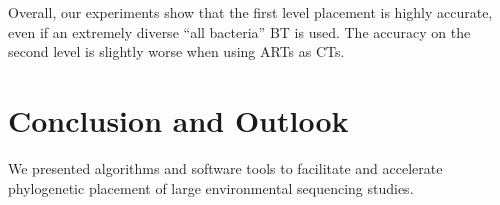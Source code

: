 
Overall, our experiments show that the first level placement is highly accurate,
even if an extremely diverse ``all bacteria'' \acl{BT} is used.
The accuracy on the second level is slightly worse when using \acp{ART} as \acp{CT}.



\section{Conclusion and Outlook}
\label{ch:AutomaticTrees:sec:ConclusionOutlook}

We presented algorithms and software tools to facilitate and accelerate
phylogenetic placement of large environmental sequencing studies. %

